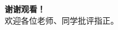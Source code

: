 \documentclass[aspectratio=169]{beamer}
\begin{document}
\begin{frame}
    \begin{center}
        \Huge{\textbf{谢谢观看！}}\\[0.5cm]
        \large{欢迎各位老师、同学批评指正。}
    \end{center}
\end{frame}
\end{document}
